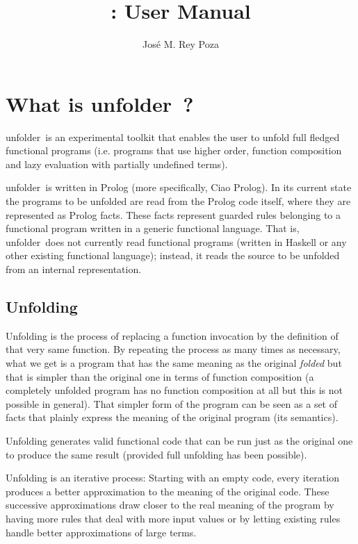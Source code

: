\documentclass[11pt,a4paper,twoside,openright]{book}
\title{\unfolder: User Manual}
\author{Jos{\'e} M. Rey Poza}
\newcommand{\unfolder}{{\textsf{unfolder~}}}
\begin{document}
\maketitle

\tableofcontents

\chapter{What is \unfolder$\!\!$?}
\label{chap_what}


\unfolder is an experimental toolkit that enables the user to unfold
full fledged functional programs (i.e. programs that use higher order,
function composition and lazy evaluation with partially undefined
terms).

\unfolder is written in Prolog (more specifically, Ciao Prolog). In
its current state the programs to be unfolded are read from the Prolog
code itself, where they are represented as Prolog facts. These facts
represent guarded rules belonging to a functional program written in a
generic functional language. That is, \unfolder does not
currently read functional programs (written in Haskell or any other
existing functional language); instead, it reads the source to be
unfolded from an internal representation.

\section{Unfolding}

Unfolding is the process of replacing a function invocation by the
definition of that very same function. By repeating the process as
many times as necessary, what we get is a program that has the same
meaning as the original {\em folded} but that is simpler than the original
one in terms of function composition (a completely unfolded program
has no function composition at all but this is not possible in
general). That simpler form of the program can be seen as a set of
facts that plainly express the meaning of the original program (its
semantics).   

Unfolding generates valid functional code that can be run just as the
original one to produce the same result (provided full unfolding has
been possible).

Unfolding is an iterative process: Starting with an empty code, every
iteration produces a better approximation to the meaning of the
original code. These successive approximations draw closer to the real
meaning of the program by having more rules that deal with more input
values or by letting existing rules handle better approximations of
large terms.
\end{document}
